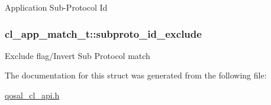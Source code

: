 Application Sub-\/\-Protocol Id \hypertarget{structcl__app__match__t_aa808b2fdd35ed55f21630678bdf1e599}{
\subsubsection[{subproto\-\_\-id\-\_\-exclude}]{ cl\-\_\-app\-\_\-match\-\_\-t\-::subproto\-\_\-id\-\_\-exclude}}\label{structcl__app__match__t_aa808b2fdd35ed55f21630678bdf1e599}
Exclude flag/\-Invert Sub Protocol match 

The documentation for this struct was generated from the following file\-:\begin{DoxyCompactItemize}
\item 
\hyperlink{qosal__cl__api_8h}{qosal\-\_\-cl\-\_\-api.\-h}\end{DoxyCompactItemize}
